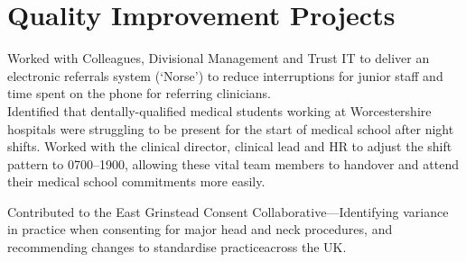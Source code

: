 \section*{Quality Improvement Projects}

 Worked with Colleagues, Divisional Management and Trust IT to deliver an electronic referrals system (`Norse') to reduce interruptions for junior staff and time spent on the phone for referring clinicians.
\\
 Identified that dentally-qualified medical students working at Worcestershire hospitals were struggling to be present for the start of medical school after night shifts. Worked with the clinical director, clinical lead and HR to adjust the shift pattern to 0700--1900, allowing these vital team members to handover and attend their medical school commitments more easily.

 Contributed to the East Grinstead Consent Collaborative---Identifying variance in practice when consenting for major head and neck procedures, and recommending changes to standardise practiceacross the UK.

